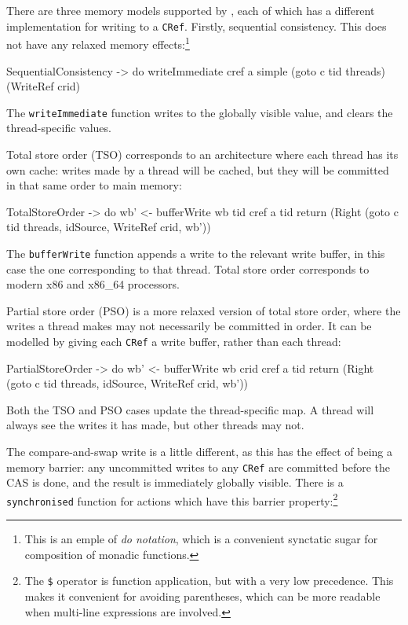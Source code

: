 There are three memory models supported by \dejafu{}, each of which
has a different implementation for writing to a \verb|CRef|. Firstly,
sequential consistency. This does not have any relaxed memory
effects:\footnote{This is an emple of \emph{do notation}, which is a
  convenient synctatic sugar for composition of monadic functions.}

\begin{haskellcode}
  SequentialConsistency -> do
    writeImmediate cref a
    simple (goto c tid threads) (WriteRef crid)
\end{haskellcode}

The \verb|writeImmediate| function writes to the globally visible
value, and clears the thread-specific values.

Total store order (TSO) corresponds to an architecture where each
thread has its own cache: writes made by a thread will be cached, but
they will be committed in that same order to main memory:

\begin{haskellcode}
  TotalStoreOrder -> do
    wb' <- bufferWrite wb tid cref a tid
    return (Right (goto c tid threads, idSource, WriteRef crid, wb'))
\end{haskellcode}

The \verb|bufferWrite| function appends a write to the relevant write
buffer, in this case the one corresponding to that thread. Total store
order corresponds to modern x86 and x86\_64 processors.

Partial store order (PSO) is a more relaxed version of total store order,
where the writes a thread makes may not necessarily be committed in
order. It can be modelled by giving each \verb|CRef| a write buffer,
rather than each thread:

\begin{haskellcode}
  PartialStoreOrder -> do
    wb' <- bufferWrite wb crid cref a tid
    return (Right (goto c tid threads, idSource, WriteRef crid, wb'))
\end{haskellcode}

Both the TSO and PSO cases update the thread-specific map. A thread
will always see the writes it has made, but other threads may not.

The compare-and-swap write is a little different, as this has the
effect of being a memory barrier: any uncommitted writes to any
\verb|CRef| are committed before the CAS is done, and the result is
immediately globally visible. There is a \verb|synchronised| function
for actions which have this barrier property:\footnote{The \texttt{\$}
  operator is function application, but with a very low
  precedence. This makes it convenient for avoiding parentheses, which
  can be more readable when multi-line expressions are involved.}

